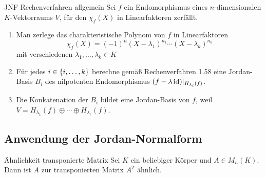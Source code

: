 \documentclass[main.tex]{subfiles}
\begin{document}
\begin{karte}{JNF Rechenverfahren allgemein}
    Sei \(f\) ein Endomorphismus eines \(n\)-dimensionalen \(K\)-Vektorraums \(V\),
    für den \(\chi_f(X)\) in Linearfaktoren zerfällt.
    \begin{enumerate}
        \item Man zerlege das charakteristische Polynom von \(f\) in
        Linearfaktoren
        \[ \chi_f(X) = (-1)^n (X-\lambda_1)^{n_1}\cdots (X-\lambda_k)^{n_k} \]
        mit verschiedenen \(\lambda_1, \ldots, \lambda_k \in K\)
        \item Für jedes \(i \in \{i,\ldots,k\}\) berechne gemäß Rechenverfahren
        1.58 eine Jordan-Basis \(B_i\) des nilpotenten Endomorphismus
        \( (f-\lambda \operatorname{id})\vert_{H_{\lambda_i}(f)} \).
        \item Die Konkatenation der \(B_i\) bildet eine Jordan-Basis von \(f\),
        weil \(V = H_{\lambda_1}(f) \oplus \cdots \oplus H_{\lambda_r}(f)\).
    \end{enumerate}
\end{karte}

\subsection*{Anwendung der Jordan-Normalform}

\begin{karte}{Ähnlichkeit transponierte Matrix}
    Sei \(K\) ein beliebiger Körper und \(A \in M_n(K)\). Dann ist 
    \(A\) zur transponierten Matrix \(A^T\) ähnlich.
\end{karte}
\end{document}
